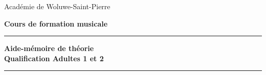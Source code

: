 \documentclass[11pt,a4paper]{scrreprt}
\begin{document}
\thispagestyle{empty}
\begin{center}
\begin{LARGE}
Académie de Woluwe-Saint-Pierre
\end{LARGE}
\end{center}

\begin{center}
\begin{LARGE}
\textbf{Cours de formation musicale}
\end{LARGE}
\end{center}

\begin{center}
\vspace{5cm}
\noindent\rule{\textwidth}{0.5mm}
\begin{huge}
\textbf{Aide-mémoire de théorie \\
\vspace{2 cm}
 Qualification Adultes 1 et 2}
\end{huge}
\noindent\rule{\textwidth}{0.5mm}
\end{center}



\end{document}
